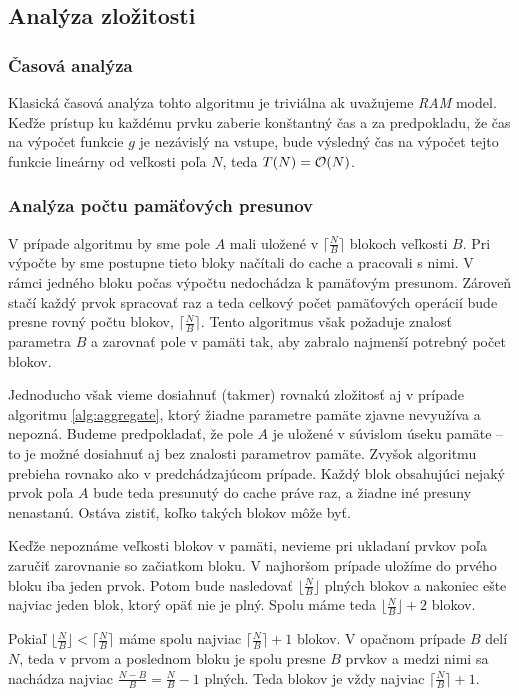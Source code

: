 \subsection{Analýza zložitosti}
\subsubsection{Časová analýza}
Klasická časová analýza tohto algoritmu je triviálna ak uvažujeme \emph{RAM} model. Keďže prístup ku každému prvku  zaberie konštantný čas a za predpokladu, že čas na výpočet funkcie $g$ je nezávislý na vstupe, bude výsledný čas na výpočet tejto funkcie lineárny od veľkosti poľa $N$, teda $T(N) = \mathcal{O}(N)$.

\subsubsection{Analýza počtu pamäťových presunov}

V prípade \aware algoritmu by sme pole $A$ mali uložené v $\lceil \frac{N}{B} \rceil$ blokoch veľkosti $B$. Pri výpočte by sme postupne tieto bloky načítali do cache a pracovali s nimi. V rámci jedného bloku počas výpočtu nedochádza k pamäťovým presunom. Zároveň stačí každý prvok spracovať raz a teda celkový počet pamäťových operácií bude presne rovný počtu blokov, $\lceil \frac{N}{B} \rceil$. Tento algoritmus však požaduje znalosť parametra $B$ a zarovnať pole v pamäti tak, aby zabralo najmenší potrebný počet blokov.

Jednoducho však vieme dosiahnuť (takmer) rovnakú zložitosť aj v prípade \obliv algoritmu \ref{alg:aggregate}, ktorý žiadne parametre pamäte zjavne nevyužíva a nepozná. Budeme predpokladať, že pole $A$ je uložené v súvislom úseku pamäte -- to je možné dosiahnuť aj bez znalosti parametrov pamäte. Zvyšok algoritmu prebieha rovnako ako v predchádzajúcom prípade. Každý blok obsahujúci nejaký prvok poľa $A$ bude teda presunutý do cache práve raz, a žiadne iné presuny nenastanú. Ostáva zistiť, koľko takých blokov môže byť.

Keďže nepoznáme veľkosti blokov v pamäti, nevieme pri ukladaní prvkov poľa zaručiť zarovnanie so začiatkom bloku. V najhoršom prípade uložíme do prvého bloku iba jeden prvok. Potom bude nasledovať $\lfloor \frac{N}{B} \rfloor$ plných blokov a nakoniec ešte najviac jeden blok, ktorý opäť nie je plný. Spolu máme teda $\lfloor \frac{N}{B} \rfloor + 2$ blokov.

Pokiaľ $\lfloor \frac{N}{B} \rfloor < \lceil \frac{N}{B} \rceil$ máme spolu najviac $\lceil \frac{N}{B} \rceil + 1$ blokov. V opačnom prípade $B$ delí $N$, teda v prvom a poslednom bloku je spolu presne $B$ prvkov a medzi nimi sa nachádza najviac $\frac{N-B}{B} = \frac{N}{B} - 1$ plných. Teda blokov je vždy najviac $\lceil \frac{N}{B} \rceil +1$.

